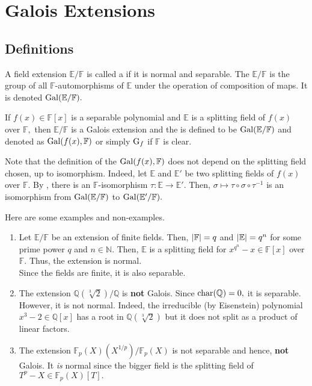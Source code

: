 \chapter{Galois Extensions}
\section{Definitions}

\begin{defn}%
    A field extension $\mathbb{E}/\mathbb{F}$ is called a  if it is normal and separable. The  $\mathbb{E}/\mathbb{F}$ is the group of all $\mathbb{F}$-automorphisms of $\mathbb{E}$ under the operation of composition of maps. It is denoted $\operatorname{Gal}(\mathbb{E}/\mathbb{F}).$

    If $f(x) \in \mathbb{F}[x]$ is a separable polynomial and $\mathbb{E}$ is a splitting field of $f(x)$ over $\mathbb{F},$ then $\mathbb{E}/\mathbb{F}$ is a Galois extension and the  is defined to be $\operatorname{Gal}(\mathbb{E}/\mathbb{F})$ and denoted as $\operatorname{Gal}(f(x), \mathbb{F})$ or simply $\operatorname{G}_f$ if $\mathbb{F}$ is clear.
\end{defn}

\begin{rem}
    Note that the definition of the $\operatorname{Gal}(f(x), \mathbb{F})$ does not depend on the splitting field chosen, up to isomorphism. Indeed, let $\mathbb{E}$ and $\mathbb{E}'$ be two splitting fields of $f(x)$ over $\mathbb{F}.$ By , there is an $\mathbb{F}$-isomorphism $\tau : \mathbb{E} \to \mathbb{E}'.$ Then, $\sigma \mapsto \tau \circ \sigma \circ \tau^{-1}$ is an isomorphism from $\operatorname{Gal}(\mathbb{E}/\mathbb{F})$ to $\operatorname{Gal}(\mathbb{E}'/\mathbb{F}).$
\end{rem}

\begin{ex}
    Here are some examples and non-examples.
    \begin{enumerate}
        \item Let $\mathbb{E}/\mathbb{F}$ be an extension of finite fields. Then, ${\left\lvert \mathbb{F} \right\lvert} = q$ and ${\left\lvert \mathbb{E} \right\lvert} = q^n$ for some prime power $q$ and $n \in \mathbb{N}.$ Then, $\mathbb{E}$ is a splitting field for $x^{q^n} - x \in \mathbb{F}[x]$ over $\mathbb{F}.$ Thus, the extension is normal. \\
        Since the fields are finite, it is also separable.
        \item The extension $\mathbb{Q}(\sqrt[3]{2})/\mathbb{Q}$ is \textbf{not} Galois. Since $\operatorname{char}(\mathbb{Q}) = 0,$ it is separable. However, it is not normal. Indeed, the irreducible (by Eisenstein) polynomial $x^3 - 2 \in \mathbb{Q}[x]$ has a root in $\mathbb{Q}(\sqrt[3]{2})$ but it does not split as a product of linear factors.
        \item The extension $\mathbb{F}_p(X)(X^{1/p})/\mathbb{F}_p(X)$ is not separable and hence, \textbf{not} Galois. It \emph{is} normal since the bigger field is the splitting field of $T^p - X \in \mathbb{F}_p(X)[T].$
    \end{enumerate}
\end{ex}

